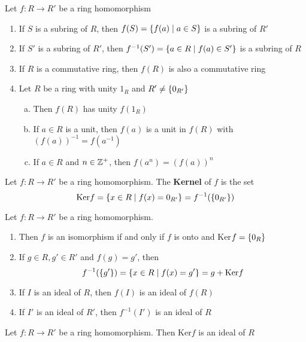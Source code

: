 \begin{theorem} Let $f: R \to R'$  be a ring homomorphism

    \begin{enumerate}
        \item If $S$ is a subring of $R$, then $f(S) = \qty{f(a) \mid a \in S}$ is a subring of $R'$
        \item If $S'$ is a subring of $R'$, then $f^{-1}(S') = \qty{a \in R \mid  f(a) \in S'}$ is a subring of $R$
        \item If $R$ is a commutative ring, then $f(R)$ is also a commutative ring
        \item Let $R$  be a ring with unity $1_R$ and $R' \neq \qty{0_{R'}}$
        \begin{enumerate}[(a)]
            \item Then $f(R)$ has unity $f(1_R)$
            \item If $a \in R$ is a  unit, then $f(a)$ is a unit in $f(R)$ with $(f(a))^{-1} = f(a^{-1})$
            \item If $a \in R$ and $n \in \mathbb{Z}^{+}$, then $f(a^n) = (f(a))^n$
        \end{enumerate}
    \end{enumerate}
\end{theorem}

\begin{definition}
    Let $f: R \to R'$  be a ring homomorphism. The \textbf{Kernel} of $f$ is the set
    \[ \text{Ker}f = \qty{x \in R \mid f(x) = 0_{R'}} = f^{-1}(\qty{0_{R'}}) \]
\end{definition}

\begin{remark}
    Let $f: R \to R'$  be a ring homomorphism.
    \begin{enumerate}
        \item Then $f$ is an isomorphism if and only if $f$ is onto and Ker$f = \qty{0_R}$
        \item If $g \in R, g' \in R'$ and $f(g) = g'$, then 
        \[ f^{-1}(\qty{g'}) = \qty{x \in R \mid f(x) = g'} = g + \text{Ker}f \]
        \item If $I$ is an ideal of $R$, then $f(I)$ is an ideal of $f(R)$
        \item If $I'$ is an ideal of $R'$, then $f^{-1}(I')$ is an ideal of $R$
    \end{enumerate}
\end{remark}

\begin{theorem}
    Let $f : R \to R'$ be a ring homomorphism. Then $\text{Ker}f$ is an ideal of $R$
\end{theorem}

